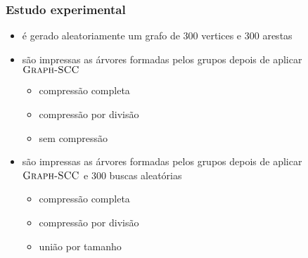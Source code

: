 \documentclass{beamer}
\begin{document}

\begin{frame}
\frametitle{Estudo experimental}

\begin{itemize}
\item é gerado aleatoriamente um grafo de 300 vertices e 300 arestas
\item são impressas as árvores formadas pelos grupos depois de aplicar
  $\textnormal{\scshape Graph-SCC}$
\begin{itemize}
\item compressão completa
\item compressão por divisão
\item sem compressão
\end{itemize}
\item são impressas as árvores formadas pelos grupos depois de aplicar
  $\textnormal{\scshape Graph-SCC}$ e 300 buscas aleatórias
\begin{itemize}
\item compressão completa
\item compressão por divisão
\item união por tamanho
\end{itemize}

\end{itemize}

\end{frame}
\end{document}
